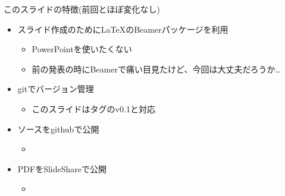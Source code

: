 \begin{frame}{このスライドの特徴(前回とほぼ変化なし)}
 \begin{itemize}
  \item スライド作成のために\LaTeX のBeamerパッケージを利用
        \begin{itemize}
         \item PowerPointを使いたくない
         \item 前の発表の時にBeamerで痛い目見たけど、今回は大丈夫だろうか…
        \end{itemize}
  \item gitでバージョン管理
        \begin{itemize}
         \item このスライドはタグのv0.1と対応
        \end{itemize}
  \item ソースをgithubで公開
        \begin{itemize}
         \item \href{https://github.com/sakabar/prml_titech_8-1_8-2}{}
        \end{itemize}
  \item PDFをSlideShareで公開
        \begin{itemize}
         \item \href{http://www.slideshare.net/takafumisakakibara75/slide-44207685}{}
        \end{itemize}
 \end{itemize}
\end{frame}
